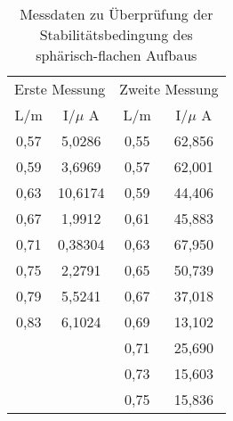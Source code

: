 \begin{table}[h!]
  \centering
  \caption{Messdaten zu Überprüfung der Stabilitätsbedingung des sphärisch-flachen Aufbaus}
  \label{tab:stabflat}
  \begin{tabular}{c c c c}
    \toprule
    \multicolumn{2}{c}{Erste Messung} & \multicolumn{2}{c}{Zweite Messung}\\
      L/m & I/$\mu$ A & L/m & I/$\mu$ A \\
      \midrule
      0,57 & 5,0286  & 0,55 & 62,856 \\
      0,59 & 3,6969  & 0,57 & 62,001 \\
      0,63 & 10,6174 & 0,59 & 44,406 \\
      0,67 & 1,9912  & 0,61 & 45,883 \\
      0,71 & 0,38304 & 0,63 & 67,950 \\
      0,75 & 2,2791  & 0,65 & 50,739 \\
      0,79 & 5,5241  & 0,67 & 37,018 \\
      0,83 & 6,1024  & 0,69 & 13,102 \\
          &          & 0,71 & 25,690 \\
          &          & 0,73 & 15,603 \\
          &          & 0,75 & 15,836 \\
    \bottomrule
  \end{tabular}
\end{table}

%
